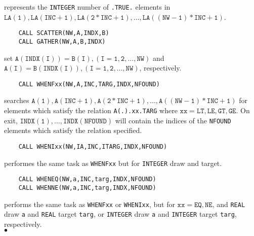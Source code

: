 represents the {\tt INTEGER} number of {\tt .TRUE.} elements in \\
$\mathtt{LA(1),LA(INC+1),LA(2*INC+1),\ldots,LA((NW-1)*INC+1)}$.
\begin{verbatim}
    CALL SCATTER(NW,A,INDX,B)
    CALL GATHER(NW,A,B,INDX)
\end{verbatim}
set $\mathtt{A(INDX(I))=B(I),(I=1,2,\ldots,NW)}$
and $\mathtt{A(I)=B(INDX(I)),(I=1,2,\ldots,NW)}$, respectively.
\begin{verbatim}
    CALL WHENFxx(NW,A,INC,TARG,INDX,NFOUND)
\end{verbatim}
searches $\mathtt{A(1),A(INC+1),A(2*INC+1),\ldots,A((NW-1)*INC+1)}$ for
elements which satisfy the relation {\tt A(.).xx.TARG} where
$\mathtt{xx=LT,LE,GT,GE}$. On exit,
$\mathtt{INDX(1),\ldots,INDX(NFOUND)}$ will contain the indices of
the {\tt NFOUND} elements which satisfy the relation specified.
\newpage
\begin{verbatim}
    CALL WHENIxx(NW,IA,INC,ITARG,INDX,NFOUND)
\end{verbatim}
performes the same task as {\tt WHENFxx} but for {\tt INTEGER}
draw and target.
\begin{verbatim}
    CALL WHENEQ(NW,a,INC,targ,INDX,NFOUND)
    CALL WHENNE(NW,a,INC,targ,INDX,NFOUND)
\end{verbatim}
performs the same task as {\tt WHENFxx} or {\tt WHENIxx}, but for
$\mathtt{xx=EQ,NE}$, and {\tt REAL} draw {\tt a} and {\tt REAL} target
{\tt targ}, or {\tt INTEGER} draw {\tt a} and {\tt INTEGER} target
{\tt targ}, respectively.
\\ $\bullet$
